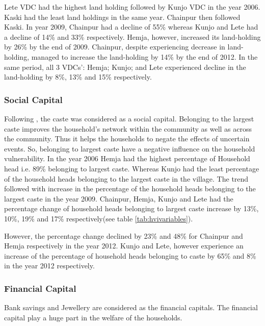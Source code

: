 Lete VDC had the highest land holding followed by Kunjo VDC in the year 2006. Kaski had the least land holdings in the same year. Chainpur then followed Kaski. In year 2009, Chainpur had a decline of 55\% whereas Kunjo and Lete had a decline of 14\% and 33\% respectively. Hemja, however, increased its land-holding by 26\% by the end of 2009. Chainpur, despite experiencing decrease in land-holding, managed to increase the land-holding by 14\% by the end of 2012. In the same period, all 3 VDCs': Hemja; Kunjo; and Lete experienced decline in the land-holding by 8\%, 13\% and 15\% respectively.\par 

\subsubsection{Social Capital}  
Following \cite{alha2018other, vanneman2006social}, the caste was considered as a social capital. Belonging to the largest caste improves the household's network within the community as well as across the community. Thus it helps the households to negate the effects of uncertain events. So, belonging to largest caste have a negative influence on the household vulnerability. In the year 2006 Hemja had the highest percentage of Household head i.e. 89\% belonging to largest caste. Whereas Kunjo had the least percentage of the household heads belonging to the largest caste in the village. The trend followed with increase in the percentage of the household heads belonging to the largest caste in the year 2009. Chainpur, Hemja, Kunjo and Lete had the percentage change of household heads belonging to largest caste increase by 13\%, 10\%, 19\% and 17\% respectively(see table \ref{tab:hvivariables}).\par  

However, the percentage change declined by 23\% and 48\% for Chainpur and Hemja respectively in the year 2012. Kunjo and Lete, however experience an increase of the percentage of household heads belonging to caste by 65\% and 8\% in the year 2012 respectively.\par 

\subsubsection{Financial Capital}
Bank savings and Jewellery are considered as the financial capitals. The financial capital play a huge part in the welfare of the households.\par 

